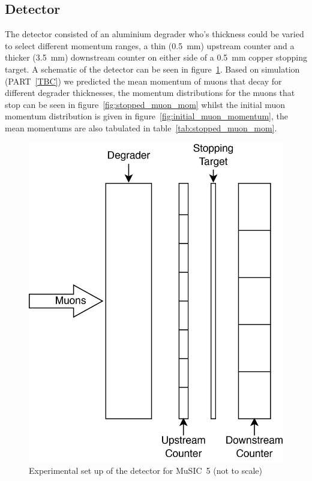 \subsection{Detector} %
\label{sub:detector}
The detector consisted of an aluminium degrader who's thickness could be varied to select different momentum ranges, a thin (0.5~mm) upstream counter and a thicker (3.5~mm) downstream counter on either side of a 0.5~mm copper stopping target. A schematic of the detector can be seen in figure~\ref{fig:m5_setup}. Based on simulation (PART~\ref{TBC}) we predicted the mean momentum of muons that decay for different degrader thicknesses, the momentum distributions for the muons that stop can be seen in figure~\ref{fig:stopped_muon_mom} whilst the initial muon momentum distribution is given in figure~\ref{fig:initial_muon_momentum}, the mean momentums are also tabulated in table~\ref{tab:stopped_muon_mom}.
\begin{figure}[htbp]
    \centering
        \includegraphics[scale=0.5]{images/momentum_spectrum/Detector_setup_music5.png}
    \caption{Experimental set up of the detector for MuSIC~5 (not to scale)}
    \label{fig:m5_setup}
\end{figure}  

